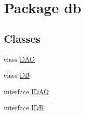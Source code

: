 \hypertarget{namespacedb}{}\section{Package db}
\label{namespacedb}
\subsection*{Classes}
\begin{DoxyCompactItemize}
\item 
class \hyperlink{classdb_1_1_d_a_o}{D\+AO}
\item 
class \hyperlink{classdb_1_1_d_b}{DB}
\item 
interface \hyperlink{interfacedb_1_1_i_d_a_o}{I\+D\+AO}
\item 
interface \hyperlink{interfacedb_1_1_i_d_b}{I\+DB}
\end{DoxyCompactItemize}
